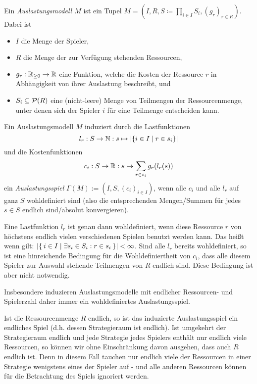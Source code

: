 \begin{defn}\label{def:Auslastungsmodel}
	Ein \emph{Auslastungsmodell $M$} ist ein Tupel $M = (I, R, S \coloneqq \prod_{i\in I} S_i, (g_r)_{r \in R})$. Dabei ist
	\begin{itemize}
		\item $I$ die Menge der Spieler,
		\item $R$ die Menge der zur Verfügung stehenden Ressourcen,
		\item $g_r: \mathbb{R}_{\geq 0} \to \mathbb{R}$ eine Funktion, welche die Kosten der Ressource $r$ in Abhängigkeit von ihrer Auslastung beschreibt, und
		\item $S_i \subseteq \mathcal{P}(R)$ eine (nicht-leere) Menge von Teilmengen der Ressourcenmenge, unter denen sich der Spieler $i$ für eine Teilmenge entscheiden kann. 
	\end{itemize}
\end{defn}

\begin{defn}\label{def:Auslastungsspiel}
	Ein Auslastungsmodell $M$ induziert durch die Lastfunktionen
		\[l_r: S \to \mathbb{N}: s \mapsto \left|\{i\in I \mid r \in s_i\}\right|\]
	und die Kostenfunktionen
		\[c_i: S \to \mathbb{R}: s \mapsto \sum_{r \in s_i} g_r(l_r(s)) \]
	ein \emph{Auslastungsspiel} $\Gamma(M) := (I, S, (c_i)_{i \in I})$, wenn alle $c_i$ und alle $l_r$ auf ganz $S$ wohldefiniert sind (also die entsprechenden Mengen/Summen für jedes $s \in S$ endlich sind/absolut konvergieren).
\end{defn}

\begin{bem}\label{bem:AuslSpielWohldefiniertheit}
	Eine Lastfunktion $l_r$ ist genau dann wohldefiniert, wenn diese Ressource $r$ von höchstens endlich vielen verschiedenen Spielen benutzt werden kann. Das heißt wenn gilt: $\left|\Set{i \in I | \exists s_i \in S_i: r \in s_i}\right| < \infty$. Sind alle $l_r$ bereits wohldefiniert, so ist eine hinreichende Bedingung für die Wohldefiniertheit von $c_i$, dass alle diesem Spieler zur Auswahl stehende Teilmengen von $R$ endlich sind. Diese Bedingung ist aber nicht notwendig.
	
	Insbesondere induzieren Auslastungsmodelle mit endlicher Ressourcen- und Spielerzahl daher immer ein wohldefiniertes Auslastungsspiel.
	
	Ist die Ressourcenmenge $R$ endlich, so ist das induzierte Auslastungsspiel ein endliches Spiel (d.h. dessen Strategieraum ist endlich). Ist umgekehrt der Strategieraum endlich und jede Strategie jedes Spielers enthält nur endlich viele Ressourcen, so können wir ohne Einschränkung davon ausgehen, dass auch $R$ endlich ist. Denn in diesem Fall tauchen nur endlich viele der Ressourcen in einer Strategie wenigstens eines der Spieler auf - und alle anderen Ressourcen können für die Betrachtung des Spiels ignoriert werden.
\end{bem}

